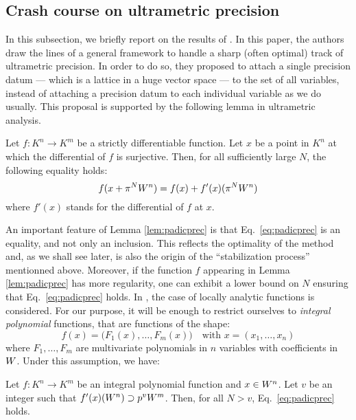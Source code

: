 \documentclass{article}
\begin{document}
\subsection{Crash course on ultrametric precision}

In this subsection, we briefly report on the results of \cite{padicprec}. In this 
paper, the authors draw the lines of a general framework to handle a 
sharp (often optimal) track of ultrametric precision. In order to do so, 
they proposed to attach a single precision datum --- which is a lattice 
in a huge vector space --- to the set of all variables, instead of 
attaching a precision datum to each individual variable as we do 
usually. This proposal is supported by the following lemma in ultrametric
analysis.

\begin{lem}
\label{lem:padicprec}
Let $f : K^n \to K^m$ be a strictly differentiable function. Let $x$
be a point in $K^n$ at which the differential of $f$ is surjective.
Then, for all sufficiently large $N$, the following equality holds:
\begin{equation}
\label{eq:padicprec}
f(x + \pi^N W^n) = f(x) + f'(x)(\pi^N W^n)
\end{equation}
where $f'(x)$ stands for the differential of $f$ at $x$.
\end{lem}

An important feature of Lemma \ref{lem:padicprec} is that 
Eq.~\eqref{eq:padicprec} is an equality, and not only an inclusion. 
This reflects the optimality of the method and, as we shall see later, 
is also the origin of the ``stabilization process'' mentionned above.
Moreover, if the function $f$ appearing in Lemma \ref{lem:padicprec} 
has more regularity, one can exhibit a lower bound on $N$ ensuring
that Eq.~\eqref{eq:padicprec} holds. In \cite{padicprec}, the case of 
locally analytic functions is considered. For our purpose, it will be 
enough to restrict ourselves to \emph{integral polynomial} functions, 
that are functions of the shape:
$$f(x) = \big(F_1(x), \ldots, F_m(x)\big)
\quad \text{with } x = (x_1, \ldots, x_n)$$
where $F_1, \ldots, F_m$ are multivariate polynomials in $n$ variables
with coefficients in $W$. Under this assumption, we have:

\begin{prop}
\label{prop:padicprec}
Let $f : K^n \to K^m$ be an integral polynomial function and $x \in
W^n$. Let $v$ be an integer such that $f'(x)(W^n) \supset p^v W^m$.
Then, for all $N > v$, Eq.~\eqref{eq:padicprec} holds.
\end{prop}
\end{document}
